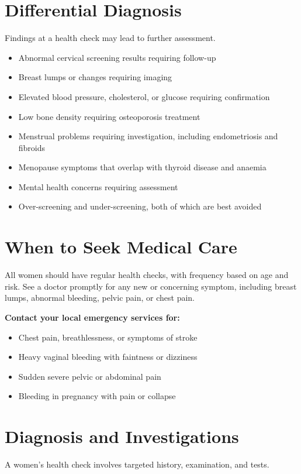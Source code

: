 \section*{Differential Diagnosis}
Findings at a health check may lead to further assessment.

\begin{itemize}
    \item Abnormal cervical screening results requiring follow-up
    \item Breast lumps or changes requiring imaging
    \item Elevated blood pressure, cholesterol, or glucose requiring confirmation
    \item Low bone density requiring osteoporosis treatment
    \item Menstrual problems requiring investigation, including endometriosis and fibroids
    \item Menopause symptoms that overlap with thyroid disease and anaemia
    \item Mental health concerns requiring assessment
    \item Over-screening and under-screening, both of which are best avoided
\end{itemize}

\section*{When to Seek Medical Care}
All women should have regular health checks, with frequency based on age and risk. See a doctor promptly for any new or concerning symptom, including breast lumps, abnormal bleeding, pelvic pain, or chest pain.

\textbf{Contact your local emergency services for:}
\begin{itemize}
    \item Chest pain, breathlessness, or symptoms of stroke
    \item Heavy vaginal bleeding with faintness or dizziness
    \item Sudden severe pelvic or abdominal pain
    \item Bleeding in pregnancy with pain or collapse
\end{itemize}

\section*{Diagnosis and Investigations}
A women's health check involves targeted history, examination, and tests.

